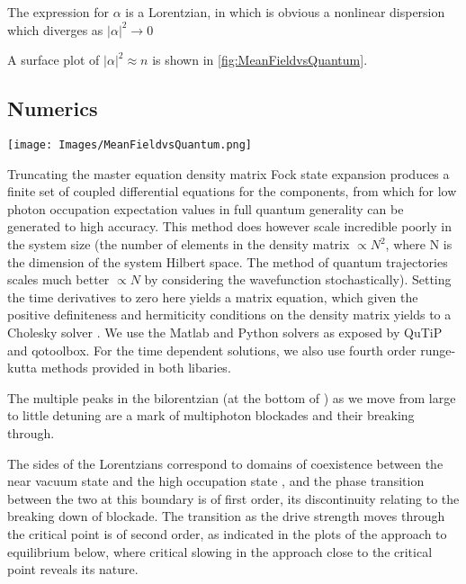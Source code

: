 The expression for $\alpha$ is a Lorentzian, in which is obvious a nonlinear dispersion which diverges as $|\alpha|^2 \rightarrow 0$

A surface plot of $|\alpha|^2 \approx n$ is shown in \ref{fig:MeanFieldvsQuantum}.
\subsection{Numerics}
\begin{figure*}
 \texttt{[image: Images/MeanFieldvsQuantum.png]}
 \caption{Comparison of mean field and fully quantum contour plots with critical points at $\frac{\Epsilon}{2}$ highlighted}\label{fig:MeanFieldvsQuantum}
 \end{figure*}

Truncating the master equation density matrix Fock state expansion produces a finite set of coupled differential equations for the components, from which for low photon occupation expectation values in full quantum generality can be generated to high accuracy. This method does however scale incredible poorly in the system size (the number of elements in the density matrix $\propto N^2$, where N is the dimension of the system Hilbert space. The method of quantum trajectories scales much better \cite{Molmer1993} $\propto N$ by considering the wavefunction stochastically). Setting the time derivatives to zero here yields a matrix equation, which given the positive definiteness and hermiticity conditions on the density matrix yields to a Cholesky solver \cite{Press1992}. We use the Matlab and Python solvers as exposed by QuTiP \cite{Johansson2013a} and qotoolbox\cite{Tan1999a}. For the time dependent solutions, we also use fourth order runge-kutta methods provided in both libaries.

The multiple peaks in the bilorentzian (at the bottom of \cite[Figure 1]{Carmichael2015}) as we move from large to little detuning are a mark of multiphoton blockades and their breaking through.

The sides of the Lorentzians correspond to domains of coexistence between the near vacuum state and the high occupation state \cite{Carmichael2015}, and the phase transition between the two at this boundary is of first order, its discontinuity relating to the breaking down of blockade. The transition as the drive strength moves through the critical point is of second order, as indicated in the plots of the approach to equilibrium below, where critical slowing in the approach close to the critical point reveals its nature.

